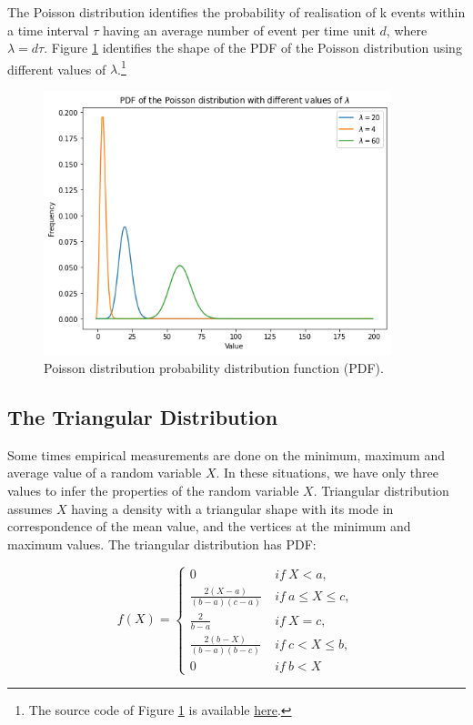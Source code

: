 The Poisson distribution identifies the probability of realisation of k events within a time interval $\tau$ having an average number of event per time unit $d$, where $\lambda=d\tau$. Figure \ref{fig_poisson} identifies the shape of the PDF of the Poisson distribution using different values of $\lambda$.\footnote{The source code of Figure \ref{fig_poisson} is available \href{https://github.com/aletuf93/logproj/blob/master/examples/03.\%20Statistics.ipynb}{here}.
}


\begin{figure}[hbt!]
\centering
\includegraphics[width=0.9\textwidth]{SectionLetsMath/elemStat_figures/fig_poisson.png}
\captionsetup{type=figure}
\caption{Poisson distribution probability distribution function (PDF).}
\label{fig_poisson}
\end{figure}

\subsection{The Triangular Distribution}
Some times empirical measurements are done on the minimum, maximum and average value of a random variable $X$. In these situations, we have only three values to infer the properties of the random variable $X$. Triangular distribution assumes $X$ having a density with a triangular shape with its mode in correspondence of the mean value, and the vertices at the minimum and maximum values. The triangular distribution has PDF:

\begin{equation}
f(X)=\left\{
                \begin{array}{ll}
                  0\ \ & if\ X<a,\\
                  \frac{2(X-a)}{(b-a)(c-a)}\ & if\ a\le X\le c,\\
                  \frac{2}{b-a}\ & if\ X=c,\\
                  \frac{2(b-X)}{(b-a)(b-c)}\ & if\ c<X\le b,\\
                  0\ & if\ b<X
                \end{array}
              \right.
\label{eq_triangularDF}
\end{equation}

